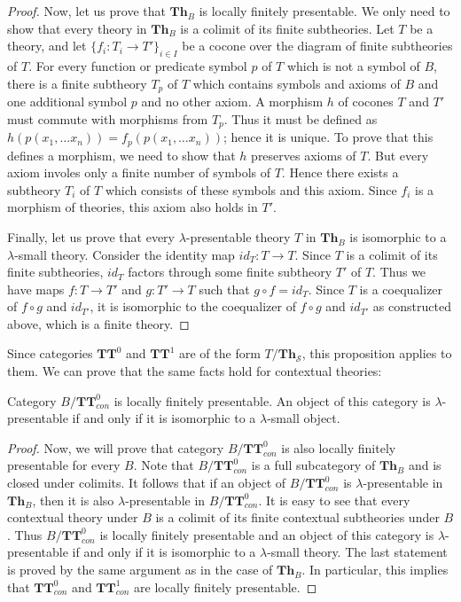 \documentclass[reqno]{amsart}
\theoremstyle{definition}
\theoremstyle{remark}
\newcommand{\cat}[1]{\mathbf{#1}}
\newcommand{\Th}{\cat{Th}}
\newcommand{\algtt}{\cat{TT}}
\numberwithin{figure}{section}
\begin{document}
\begin{proof}
Now, let us prove that $\Th_B$ is locally finitely presentable.
We only need to show that every theory in $\Th_B$ is a colimit of its finite subtheories.
Let $T$ be a theory, and let $\{ f_i : T_i \to T' \}_{i \in I}$ be a cocone over the diagram of finite subtheories of $T$.
For every function or predicate symbol $p$ of $T$ which is not a symbol of $B$, there is a finite subtheory $T_p$ of $T$ which contains symbols and axioms of $B$ and one additional symbol $p$ and no other axiom.
A morphism $h$ of cocones $T$ and $T'$ must commute with morphisms from $T_p$.
Thus it must be defined as $h(p(x_1, \ldots x_n)) = f_p(p(x_1, \ldots x_n))$; hence it is unique.
To prove that this defines a morphism, we need to show that $h$ preserves axioms of $T$.
But every axiom involes only a finite number of symbols of $T$.
Hence there exists a subtheory $T_i$ of $T$ which consists of these symbols and this axiom.
Since $f_i$ is a morphism of theories, this axiom also holds in $T'$.

Finally, let us prove that every $\lambda$-presentable theory $T$ in $\Th_B$ is isomorphic to a $\lambda$-small theory.
Consider the identity map $id_T : T \to T$.
Since $T$ is a colimit of its finite subtheories, $id_T$ factors through some finite subtheory $T'$ of $T$.
Thus we have maps $f : T \to T'$ and $g : T' \to T$ such that $g \circ f = id_T$.
Since $T$ is a coequalizer of $f \circ g$ and $id_{T'}$, it is isomorphic to the coequalizer of $f \circ g$ and $id_{T'}$ as constructed above, which is a finite theory.
\end{proof}

Since categories $\algtt^0$ and $\algtt^1$ are of the form $T/\Th_\mathcal{S}$, this proposition applies to them.
We can prove that the same facts hold for contextual theories:

\begin{cor}
Category $B/\algtt^0_{con}$ is locally finitely presentable.
An object of this category is $\lambda$-presentable if and only if it is isomorphic to a $\lambda$-small object.
\end{cor}
\begin{proof}
Now, we will prove that category $B/\algtt^0_{con}$ is also locally finitely presentable for every $B$.
Note that $B/\algtt^0_{con}$ is a full subcategory of $\Th_B$ and is closed under colimits.
It follows that if an object of $B/\algtt^0_{con}$ is $\lambda$-presentable in $\Th_B$, then it is also $\lambda$-presentable in $B/\algtt^0_{con}$.
It is easy to see that every contextual theory under $B$ is a colimit of its finite contextual subtheories under $B$.
Thus $B/\algtt^0_{con}$ is locally finitely presentable and an object of this category is $\lambda$-presentable if and only if it is isomorphic to a $\lambda$-small theory.
The last statement is proved by the same argument as in the case of $\Th_B$.
In particular, this implies that $\algtt^0_{con}$ and $\algtt^1_{con}$ are locally finitely presentable.
\end{proof}
\end{document}
